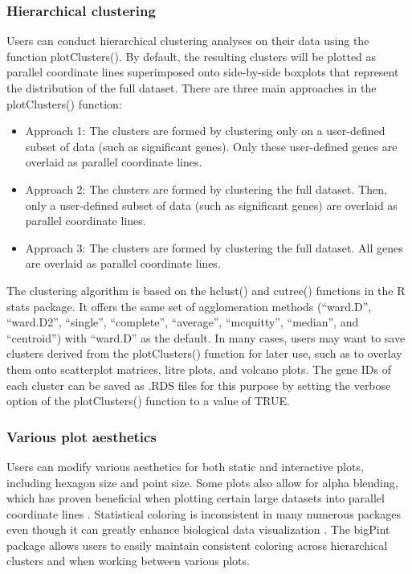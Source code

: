 \documentclass{bmcart}
\begin{document}
\subsubsection*{Hierarchical clustering}

Users can conduct hierarchical clustering analyses on their data using the function plotClusters(). By default, the resulting clusters will be plotted as parallel coordinate lines superimposed onto side-by-side boxplots that represent the distribution of the full dataset. There are three main approaches in the plotClusters() function:

\begin{itemize}  
\item Approach 1: The clusters are formed by clustering only on a user-defined subset of data (such as significant genes). Only these user-defined genes are overlaid as parallel coordinate lines. 
\item Approach 2: The clusters are formed by clustering the full dataset. Then, only a user-defined subset of data (such as significant genes) are overlaid as parallel coordinate lines.
\item Approach 3: The clusters are formed by clustering the full dataset. All genes are overlaid as parallel coordinate lines.
\end{itemize}

The clustering algorithm is based on the hclust() and cutree() functions in the R stats package. It offers the same set of agglomeration methods (``ward.D'', ``ward.D2'', ``single'', ``complete'', ``average'', ``mcquitty'', ``median'', and ``centroid'') with ``ward.D'' as the default. In many cases, users may want to save clusters derived from the plotClusters() function for later use, such as to overlay them onto scatterplot matrices, litre plots, and volcano plots. The gene IDs of each cluster can be saved as .RDS files for this purpose by setting the verbose option of the plotClusters() function to a value of TRUE.

\subsubsection*{Various plot aesthetics}

Users can modify various aesthetics for both static and interactive plots, including hexagon size and point size. Some plots also allow for alpha blending, which has proven beneficial when plotting certain large datasets into parallel coordinate lines \cite{unwin2007computational}. Statistical coloring is inconsistent in many numerous packages even though it can greatly enhance biological data visualization \cite{yin2012ggbio}. The bigPint package allows users to easily maintain consistent coloring across hierarchical clusters and when working between various plots.
\end{document}
